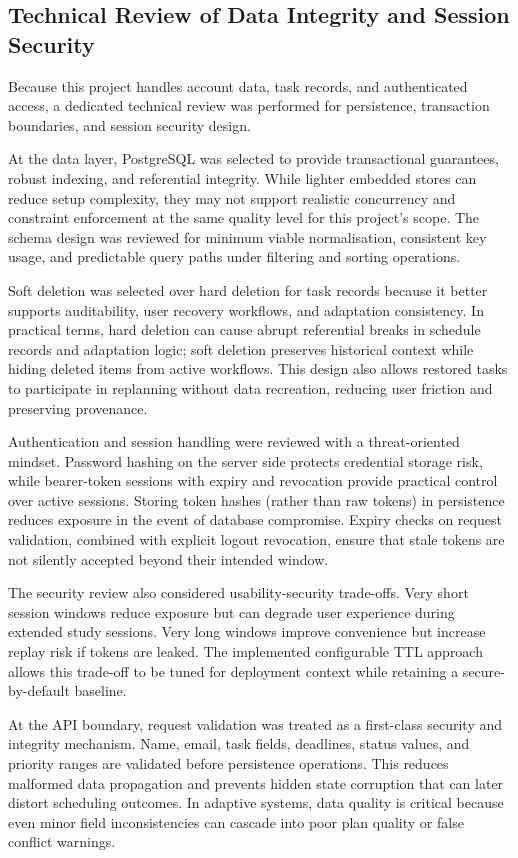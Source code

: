 \documentclass[12pt]{article}
\begin{document}
\subsection{Technical Review of Data Integrity and Session Security}
Because this project handles account data, task records, and authenticated access, a dedicated technical review was performed for persistence, transaction boundaries, and session security design.

At the data layer, PostgreSQL was selected to provide transactional guarantees, robust indexing, and referential integrity. While lighter embedded stores can reduce setup complexity, they may not support realistic concurrency and constraint enforcement at the same quality level for this project's scope. The schema design was reviewed for minimum viable normalisation, consistent key usage, and predictable query paths under filtering and sorting operations.

Soft deletion was selected over hard deletion for task records because it better supports auditability, user recovery workflows, and adaptation consistency. In practical terms, hard deletion can cause abrupt referential breaks in schedule records and adaptation logic; soft deletion preserves historical context while hiding deleted items from active workflows. This design also allows restored tasks to participate in replanning without data recreation, reducing user friction and preserving provenance.

Authentication and session handling were reviewed with a threat-oriented mindset. Password hashing on the server side protects credential storage risk, while bearer-token sessions with expiry and revocation provide practical control over active sessions. Storing token hashes (rather than raw tokens) in persistence reduces exposure in the event of database compromise. Expiry checks on request validation, combined with explicit logout revocation, ensure that stale tokens are not silently accepted beyond their intended window.

The security review also considered usability-security trade-offs. Very short session windows reduce exposure but can degrade user experience during extended study sessions. Very long windows improve convenience but increase replay risk if tokens are leaked. The implemented configurable TTL approach allows this trade-off to be tuned for deployment context while retaining a secure-by-default baseline.

At the API boundary, request validation was treated as a first-class security and integrity mechanism. Name, email, task fields, deadlines, status values, and priority ranges are validated before persistence operations. This reduces malformed data propagation and prevents hidden state corruption that can later distort scheduling outcomes. In adaptive systems, data quality is critical because even minor field inconsistencies can cascade into poor plan quality or false conflict warnings.
\end{document}
